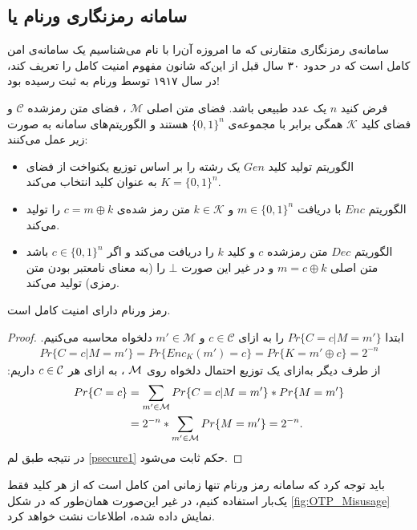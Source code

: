 \subsection*{ سامانه‌  رمزنگاری ورنام یا 
	}
سامانه‌ی رمزنگاری متقارنی که ما امروزه آن‌را با نام 
می‌شناسیم یک سامانه‌ی امن کامل است که در حدود ۳۰ سال قبل از این‌که شانون  مفهوم امنیت کامل را تعریف کند، در سال ۱۹۱۷ توسط  ورنام به ثبت رسیده بود!
\begin{definition}
	\label{otp}
	فرض کنید 
$n$
یک عدد طبیعی باشد. فضای متن اصلی
$\mathcal{M}$
، فضای متن رمز‌شده 
$\mathcal{C}$
و فضای کلید 
$\mathcal{K}$
همگی برابر با مجموعه‌ی 
$\{0, 1\}^{n}$
هستند و الگوریتم‌های سامانه به صورت زیر عمل‌ می‌کنند:
\begin{itemize}
	\item
	الگوریتم تولید کلید 
	$Gen$
	 یک رشته‌ را بر اساس توزیع یکنواخت از فضای 
	$K = \{0, 1\}^n$
	به عنوان کلید انتخاب می‌کند.
	
	\item
	الگوریتم 
	$Enc$
	با دریافت 
	$m\in\{0, 1\}^{n}$
	و 
	$k\in\mathcal{K}$
	متن رمز شده‌ی 
	$c = m\oplus k$
	را تولید می‌کند. 
	\item
	الگوریتم 
	$Dec$
	متن رمز‌شده 
	$c$
	و کلید
	$k$
	را دریافت می‌کند و اگر 
	$c\in\{0, 1\}^{n}$
	باشد متن اصلی 
	$m = c\oplus k$
	و در غیر این صورت 
	$\bot$
	را (به معنای نامعتبر بودن متن رمزی) تولید می‌کند.
\end{itemize}
\end{definition}

\begin{theorem}
رمز ورنام دارای امنیت کامل است.
\end{theorem}
\begin{proof}
	ابتدا 
	$Pr\{C = c|M = m'\}$
	را به ازای 
	$c\in\mathcal{C}$
	و
	$m'\in\mathcal{M}$
	دلخواه محاسبه می‌کنیم.
{\small \begin{align*}
Pr\{C = c|M = m'\} = Pr\{Enc_{K}(m') = c\} = Pr\{K = m'\oplus c\} = 2^{-n}
\end{align*}}
از طرف دیگر به‌ازای یک توزیع احتمال دلخواه روی 
$\mathcal{M}$
، به ازای هر 
$c\in\mathcal{C}$
داریم:
{\small \begin{align*}
Pr\{C = c\} &= \sum_{m'\in\mathcal{M}}Pr\{C = c| M = m'\} * Pr\{M = m'\}\\
 &= 2^{-n} * \sum_{m'\in\mathcal{M}} Pr\{M = m'\}  = 2^{-n}.
\end{align*}}
در نتیجه طبق لم 
\ref{psecure1}
حکم ثابت می‌شود.
\end{proof}
باید توجه  کرد که سامانه‌  رمز ورنام تنها زمانی امن کامل است که از هر کلید فقط یک‌بار  استفاده کنیم، در غیر این‌صورت همان‌طور که در شکل 
\ref{fig:OTP_Misusage}
نمایش داده شده، اطلاعات نشت خواهد کرد. 

